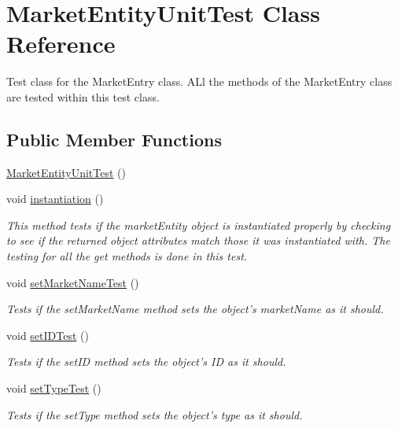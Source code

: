 \hypertarget{class_market_entity_unit_test}{\section{Market\+Entity\+Unit\+Test Class Reference}
\label{class_market_entity_unit_test}
}


Test class for the Market\+Entry class. A\+Ll the methods of the Market\+Entry class are tested within this test class.  


\subsection*{Public Member Functions}
\begin{DoxyCompactItemize}
\item 
\hyperlink{class_market_entity_unit_test_abd5946a03ecf362ca65e0372b76b23d6}{Market\+Entity\+Unit\+Test} ()
\item 
void \hyperlink{class_market_entity_unit_test_ae716975e995cecb2ba641c5596cb186e}{instantiation} ()
\begin{DoxyCompactList}\small\item\em This method tests if the market\+Entity object is instantiated properly by checking to see if the returned object attributes match those it was instantiated with. The testing for all the get methods is done in this test. \end{DoxyCompactList}\item 
void \hyperlink{class_market_entity_unit_test_ae114f2b1bced3323027e1cf8b014b7b0}{set\+Market\+Name\+Test} ()
\begin{DoxyCompactList}\small\item\em Tests if the set\+Market\+Name method sets the object's market\+Name as it should. \end{DoxyCompactList}\item 
void \hyperlink{class_market_entity_unit_test_abdc0fa7ec705528b12b5bf52f08f3615}{set\+I\+D\+Test} ()
\begin{DoxyCompactList}\small\item\em Tests if the set\+I\+D method sets the object's I\+D as it should. \end{DoxyCompactList}\item 
void \hyperlink{class_market_entity_unit_test_ad92a502043b7aa8bf34287880bf12c08}{set\+Type\+Test} ()
\begin{DoxyCompactList}\small\item\em Tests if the set\+Type method sets the object's type as it should. \end{DoxyCompactList}\item 

\end{DoxyCompactItemize}
